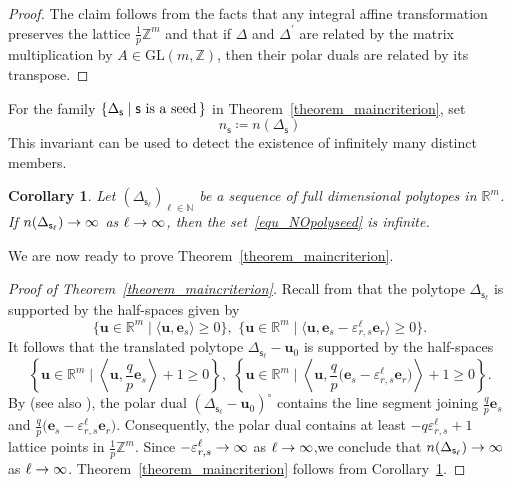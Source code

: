 \documentclass[11pt]{amsart}
\newcommand{\R}{\mathbb{R}}
\newcommand{\Z}{\mathbb{Z}}
\numberwithin{equation}{section}
\theoremstyle{plain}
\newtheorem{corollary}[theorem]{Corollary}
\theoremstyle{definition}
\def\to{\mathchoice{\longrightarrow}{\rightarrow}{\rightarrow}{\rightarrow}}
\numberwithin{equation}{section}
\newcommand{\seed}{\mathsf{s}}
\begin{document}
\begin{proof}
The claim follows from the facts that any integral affine transformation preserves the lattice $\frac{1}{p} \Z^m$ and that if $\Delta$ and $\Delta^\prime$ are related by the matrix multiplication by $A \in \mathrm{GL}(m, \Z)$, then their polar duals are related by its transpose. 
\end{proof}

For the family $\{ \Delta_\seed \mid \mbox{$\seed$ is a seed\,} \}$ in Theorem~\ref{theorem_maincriterion}, set
$$
n_\seed \coloneqq n(\Delta_\seed)
$$
This invariant can be used to detect the existence of infinitely many distinct members.

\begin{corollary}\label{cor_nslinf}
Let $(\Delta_{\seed_\ell})_{\ell \in \mathbb{N}}$ be a sequence of full dimensional polytopes in $\R^m$.
If $n(\Delta_{\seed_\ell}) \to \infty$ as $\ell \to \infty$, then the set~\eqref{equ_NOpolyseed} is infinite.
\end{corollary}

We are now ready to prove Theorem~\ref{theorem_maincriterion}.

\begin{proof}[Proof of Theorem~\ref{theorem_maincriterion}]
Recall from \cite[Lemma 4.16]{CKKP25} that the polytope $\Delta_{\seed_\ell}$ is supported by the half-spaces given by 
$$
\{ \mathbf{u} \in \R^m \mid \langle \mathbf{u}, \mathbf{e}_s \rangle \geq 0 \}, \,\, \{ \mathbf{u} \in \R^m \mid \langle \mathbf{u}, \mathbf{e}_s - \varepsilon^\ell_{r,s} \mathbf{e}_r \rangle \geq 0 \}.
$$ 
It follows that the translated polytope $\Delta_{\seed_\ell} - \mathbf{u}_0$ is supported by the half-spaces 
$$
\left\{ \mathbf{u} \in \R^m \mid \left\langle \mathbf{u}, \frac{q}{p} \mathbf{e}_s \right\rangle + 1 \geq 0 \right\}, \,\, \left\{ \mathbf{u} \in \R^m \mid \left\langle \mathbf{u}, \frac{q}{p} \bigl( \mathbf{e}_s - \varepsilon^\ell_{r,s} \mathbf{e}_r \bigr) \right\rangle + 1 \geq 0 \right\}.
$$ 
By \cite[Theorem 6.4]{Brn} (see also \cite[Lemma 4.15]{CKKP25}), the polar dual $(\Delta_{\seed_\ell} - \mathbf{u}_0)^\circ$ contains the line segment joining $ \frac{q}{p} \mathbf{e}_s$ and $\frac{q}{p} \bigl( \mathbf{e}_s - \varepsilon^\ell_{r,s} \mathbf{e}_r \bigr)$. Consequently, the polar dual contains at least $- q \varepsilon^\ell_{r,s} + 1$ lattice points in $\frac{1}{p} \Z^m$. Since $ - \varepsilon^\ell_{r,s} \to \infty$ as $\ell \to \infty$,we conclude that $n(\Delta_{\seed_\ell}) \to \infty$ as $\ell \to \infty$. Theorem~\ref{theorem_maincriterion} follows from Corollary~\ref{cor_nslinf}. 
\end{proof}
\end{document}
